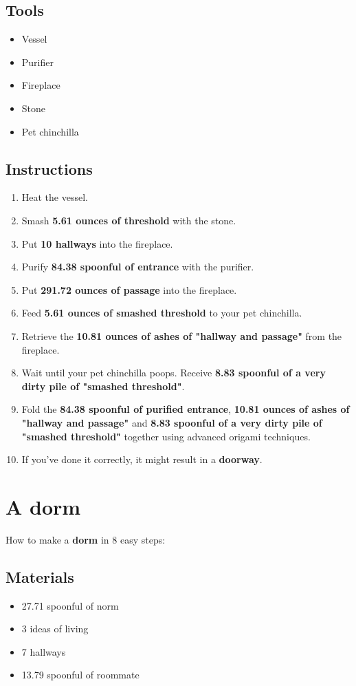 \documentclass{article}
\begin{document}
\subsection{Tools}\begin{itemize}
\item 
Vessel
\item 
Purifier
\item 
Fireplace
\item 
Stone
\item 
Pet chinchilla
\end{itemize}
\subsection{Instructions}\begin{enumerate}
\item 
Heat the vessel.
\item 
Smash \textbf{5.61 ounces of threshold} with the stone.
\item 
Put \textbf{10 hallways} into the fireplace.
\item 
Purify \textbf{84.38 spoonful of entrance} with the purifier.
\item 
Put \textbf{291.72 ounces of passage} into the fireplace.
\item 
Feed \textbf{5.61 ounces of smashed threshold} to your pet chinchilla.
\item 
Retrieve the \textbf{10.81 ounces of ashes of "hallway and passage"} from the fireplace.
\item 
Wait until your pet chinchilla poops. Receive \textbf{8.83 spoonful of a very dirty pile of "smashed threshold"}.
\item 
Fold the \textbf{84.38 spoonful of purified entrance}, \textbf{10.81 ounces of ashes of "hallway and passage"} and \textbf{8.83 spoonful of a very dirty pile of "smashed threshold"} together using advanced origami techniques.
\item 
If you've done it correctly, it might result in a \textbf{doorway}.
\end{enumerate}
\newpage
\section{A dorm}How to make a \textbf{dorm} in 8 easy steps:

\subsection{Materials}\begin{itemize}
\item 
27.71 spoonful of norm
\item 
3 ideas of living
\item 
7 hallways
\item 
13.79 spoonful of roommate
\end{itemize}
\end{document}
